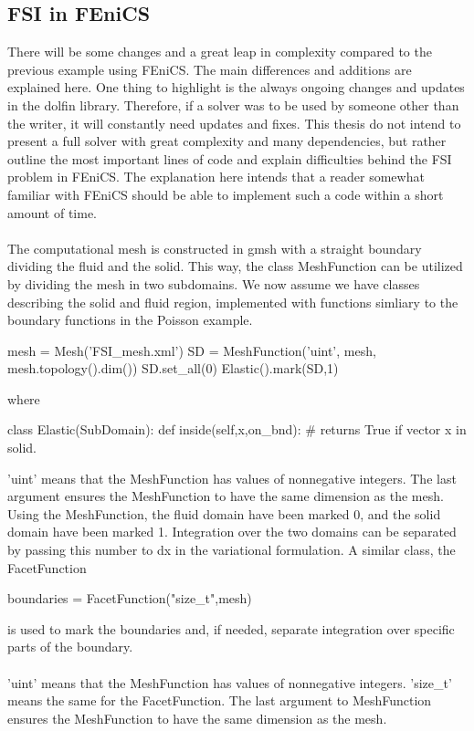 \subsection{FSI in FEniCS} \label{sec:FEniCS}
There will be some changes and a great leap in complexity compared to the previous example using FEniCS. The main differences and additions are explained here. One thing to highlight is the always ongoing changes and updates in the dolfin library. Therefore, if a solver was to be used by someone other than the writer, it will constantly need updates and fixes. This thesis do not intend to present a full solver with great complexity and many dependencies, but rather outline the most important lines of code and explain difficulties behind the FSI problem in FEniCS. The explanation here intends that a reader somewhat familiar with FEniCS should be able to implement such a code within a short amount of time. 
\\
\\
The computational mesh is constructed in gmsh with a straight boundary dividing the fluid and the solid. This way, the class MeshFunction can be utilized by dividing the mesh in two subdomains. We now assume we have classes describing the solid and fluid region, implemented with functions simliary to the boundary functions in the Poisson example. 
\begin{cverbatim}
mesh = Mesh('FSI_mesh.xml')
SD = MeshFunction('uint', mesh, mesh.topology().dim())
SD.set_all(0)
Elastic().mark(SD,1)
\end{cverbatim}
where 
\begin{cverbatim}
class Elastic(SubDomain):
	def inside(self,x,on_bnd):
		# returns True if vector x in solid.
\end{cverbatim}
'uint' means that the MeshFunction has values of nonnegative integers. The last argument ensures the MeshFunction to have the same dimension as the mesh. \\
Using the MeshFunction, the fluid domain have been marked 0, and the solid domain have been marked 1. Integration over the two domains can be separated by passing this number to dx in the variational formulation. A similar class, the FacetFunction
\begin{cverbatim}
boundaries = FacetFunction("size_t",mesh)
\end{cverbatim}
is used to mark the boundaries and, if needed, separate integration over specific parts of the boundary.
\\
\\'uint' means that the MeshFunction has values of nonnegative integers. 'size\_t' means the same for the FacetFunction. The last argument to MeshFunction ensures the MeshFunction to have the same dimension as the mesh. 
